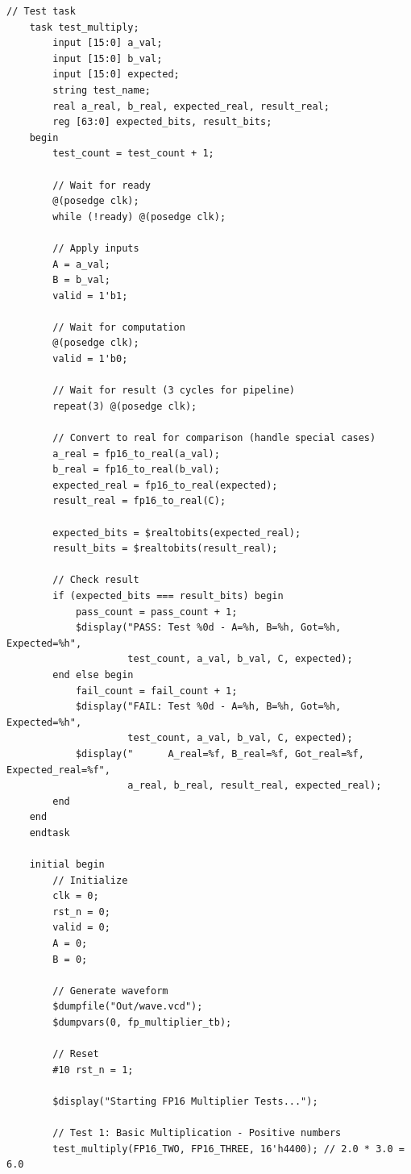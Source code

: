 \documentclass[UTF8]{ctexart}
\begin{document}
\begin{lstlisting}[frame=shadowbox,caption=tb\_fp\_multiplier\_generated.sv]
    // Test task
    task test_multiply;
        input [15:0] a_val;
        input [15:0] b_val;
        input [15:0] expected;
        string test_name;
        real a_real, b_real, expected_real, result_real;
        reg [63:0] expected_bits, result_bits;
    begin
        test_count = test_count + 1;
        
        // Wait for ready
        @(posedge clk);
        while (!ready) @(posedge clk);
        
        // Apply inputs
        A = a_val;
        B = b_val;
        valid = 1'b1;
        
        // Wait for computation
        @(posedge clk);
        valid = 1'b0;
        
        // Wait for result (3 cycles for pipeline)
        repeat(3) @(posedge clk);
        
        // Convert to real for comparison (handle special cases)
        a_real = fp16_to_real(a_val);
        b_real = fp16_to_real(b_val);
        expected_real = fp16_to_real(expected);
        result_real = fp16_to_real(C);
        
        expected_bits = $realtobits(expected_real);
        result_bits = $realtobits(result_real);
        
        // Check result
        if (expected_bits === result_bits) begin
            pass_count = pass_count + 1;
            $display("PASS: Test %0d - A=%h, B=%h, Got=%h, Expected=%h", 
                     test_count, a_val, b_val, C, expected);
        end else begin
            fail_count = fail_count + 1;
            $display("FAIL: Test %0d - A=%h, B=%h, Got=%h, Expected=%h", 
                     test_count, a_val, b_val, C, expected);
            $display("      A_real=%f, B_real=%f, Got_real=%f, Expected_real=%f",
                     a_real, b_real, result_real, expected_real);
        end
    end
    endtask
    
    initial begin
        // Initialize
        clk = 0;
        rst_n = 0;
        valid = 0;
        A = 0;
        B = 0;
        
        // Generate waveform
        $dumpfile("Out/wave.vcd");
        $dumpvars(0, fp_multiplier_tb);
        
        // Reset
        #10 rst_n = 1;
        
        $display("Starting FP16 Multiplier Tests...");
        
        // Test 1: Basic Multiplication - Positive numbers
        test_multiply(FP16_TWO, FP16_THREE, 16'h4400); // 2.0 * 3.0 = 6.0
        

\end{lstlisting}
\end{document}
